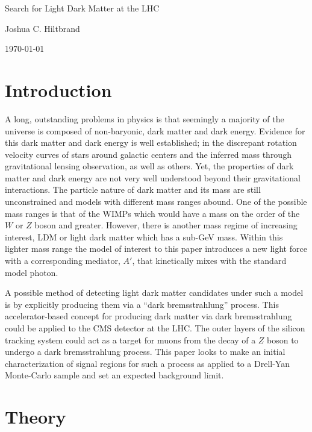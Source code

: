\documentclass[a4paper,12pt]{article}
\begin{document}
\begin{center}
    \huge Search for Light Dark Matter at the LHC 
\end{center}
\begin{center}
    \large Joshua C. Hiltbrand
\end{center}
\begin{center}
    \small \today
\end{center}
\linenumbers

\section{Introduction}

    A long, outstanding problems in physics is that seemingly a majority of the
    universe is composed of non-baryonic, dark matter and dark energy. Evidence
    for this dark matter and dark energy is well established; in the discrepant
    rotation velocity curves of stars around galactic centers and the inferred
    mass through gravitational lensing observation, as well as others. Yet, the
    properties of dark matter and dark energy are not very well understood
    beyond their gravitational interactions. The particle nature of dark matter
    and its mass are still unconstrained and models with different mass ranges
    abound. One of the possible mass ranges is that of the WIMPs which would
    have a mass on the order of the $W$ or $Z$ boson and greater.  However,
    there is another mass regime of increasing interest, LDM or light dark
    matter which has a sub-GeV mass. Within this lighter mass range the model of
    interest to this paper introduces a new light force with a corresponding
    mediator, $A'$, that kinetically mixes with the standard model photon.

    A possible method of detecting light dark matter candidates under such a
    model is by explicitly producing them via a ``dark bremsstrahlung'' process.
    This accelerator-based concept for producing dark matter via dark
    bremsstrahlung could be applied to the CMS detector at the LHC. The outer
    layers of the silicon tracking system could act as a target for muons from
    the decay of a $Z$ boson to undergo a dark bremsstrahlung process. This
    paper looks to make an initial characterization of signal regions for such a
    process as applied to a Drell-Yan Monte-Carlo sample and set an expected
    background limit.

\section{Theory}
\end{document}
